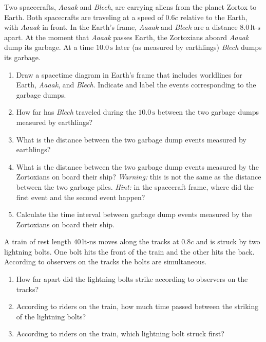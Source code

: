 \begin{exercise}
Two spacecrafts, \emph{Aaaak} and \emph{Blech}, are carrying aliens from 
the planet Zortox to Earth.  Both spacecrafts are traveling
at a speed of $0.6c$ relative to the Earth, with \emph{Aaaak} in
front.  In the Earth's frame, \emph{Aaaak} and \emph{Blech} are
a distance $8.0\,\text{lt-s}$ apart. 
At the moment that \emph{Aaaak} passes Earth, the Zortoxians aboard \emph{Aaaak} 
dump its garbage.  At a time $10.0\,\text{s}$ later 
(as measured by earthlings) \emph{Blech} dumps its garbage.  
\begin{enumerate}
\item Draw a spacetime diagram in Earth's frame that includes 
worldlines for Earth, \emph{Aaaak}, and \emph{Blech}.  Indicate and label 
the events corresponding to the garbage dumps.
\item How far has \emph{Blech} traveled during the $10.0\,\text{s}$ 
between the two garbage dumps measured by earthlings?
\item What is the distance between the two garbage dump events measured by 
earthlings?
\item What is the distance between the two garbage dump events
  measured by the Zortoxians on board their ship?  \textit{Warning:}
  this is not the same as the distance between the two garbage
  piles. \textit{Hint:} in the spacecraft frame, where did the first
  event and the second event happen?
\item Calculate the time interval between garbage dump events measured by 
the Zortoxians on board their ship.
\end{enumerate}
\label{prob:two_ships}
\end{exercise}





\begin{exercise}
A train of rest length $40\,\text{lt-ns}$ moves along the
tracks at $0.8c$ and is struck by two lightning bolts.  One bolt hits
the front of the train and the other hits the back.  According to
observers  on the tracks the bolts are simultaneous.
\begin{enumerate}
\item How far apart did the lightning bolts strike according to 
observers on the tracks?  
\item According to riders on the train, how much time passed between the
striking of the lightning bolts?  
\item According to riders on the train, which lightning bolt 
struck first? 
\end{enumerate}
\end{exercise}

